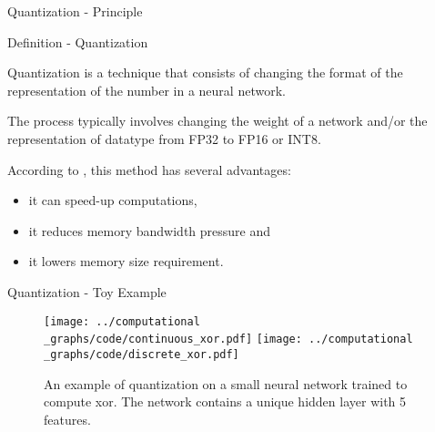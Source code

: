 \documentclass[11pt]{beamer}
\begin{document}
\begin{frame}{Quantization - Principle}

\begin{block}{Definition - Quantization}

	Quantization is a technique that consists of changing the format of the representation of the number in a neural network.

\end{block}

	The process typically involves changing the weight of a network and/or the representation of datatype from FP32 to FP16 or INT8.

	According to \cite{wu2020integerquantizationdeeplearning}, this method has several advantages:
	\begin{itemize}
	
		\item it can speed-up computations,
		
		\item it reduces memory bandwidth pressure and
		
		\item it lowers memory size requirement.
	
	\end{itemize}
\end{frame}

\begin{frame}{Quantization - Toy Example}

\begin{figure}

\texttt{[image: ../computational\\\_graphs/code/continuous\_xor.pdf]}
\texttt{[image: ../computational\\\_graphs/code/discrete\_xor.pdf]}

\caption{An example of quantization on a small neural network trained to compute xor. The network contains a unique hidden layer with 5 features.}

\end{figure}

\end{frame}
\end{document}
